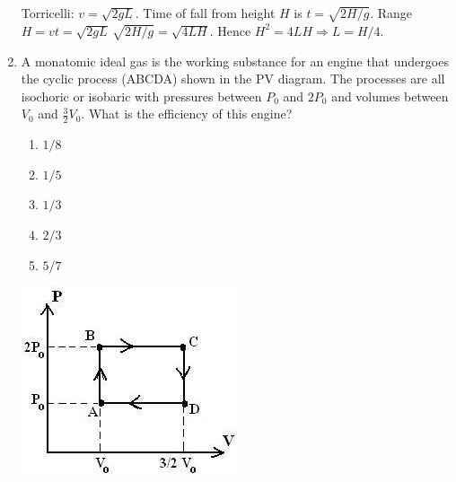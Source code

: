 ﻿\documentclass[12pt, a4paper]{article}
\begin{document}
\begin{CJK*}{UTF8}{gbsn}
\begin{enumerate}[itemsep=1.0em, topsep=0.6em]
\begin{solutionbox}
Torricelli: $v=\sqrt{2gL}$. Time of fall from height $H$ is $t=\sqrt{2H/g}$. Range $H=v t=\sqrt{2gL}\,\sqrt{2H/g}=\sqrt{4LH}$. Hence $H^2=4LH\Rightarrow L=H/4$.
\end{solutionbox}

\newpage

\item \label{prob:19}
\noindent\begin{minipage}[t]{0.6\linewidth}
\vspace{0pt}
A monatomic ideal gas is the working substance for an engine that undergoes the cyclic process (ABCDA) shown in the PV diagram. The processes are all isochoric or isobaric with pressures between $P_0$ and $2P_0$ and volumes between $V_0$ and $\frac{3}{2}V_0$. What is the efficiency of this engine?
\begin{enumerate}[label=(\Alph*)]
    \item $1/8$
    \item $1/5$
    \item $1/3$
    \item $2/3$
    \item $5/7$
\end{enumerate}
\end{minipage}%
\hfill
\begin{minipage}[t]{0.32\linewidth}
\vspace{0pt}
\centering
\includegraphics[width=\linewidth]{Problem_19_Figure.png}
\end{minipage}


\end{enumerate}
\end{CJK*}
\end{document}
